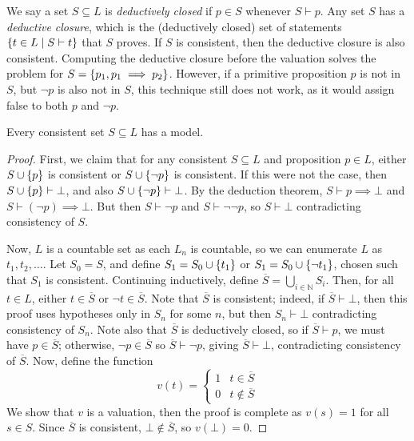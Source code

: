 We say a set \( S \subseteq L \) is \emph{deductively closed} if \( p \in S \) whenever \( S \vdash p \).
Any set \( S \) has a \emph{deductive closure}, which is the (deductively closed) set of statements \( \qty{t \in L \mid S \vdash t} \) that \( S \) proves.
If \( S \) is consistent, then the deductive closure is also consistent.
Computing the deductive closure before the valuation solves the problem for \( S = \qty{p_1, p_1 \implies p_2} \).
However, if a primitive proposition \( p \) is not in \( S \), but \( \neg p \) is also not in \( S \), this technique still does not work, as it would assign false to both \( p \) and \( \neg p \).
\begin{theorem}
    Every consistent set \( S \subseteq L \) has a model.
\end{theorem}
\begin{proof}
    First, we claim that for any consistent \( S \subseteq L \) and proposition \( p \in L \), either \( S \cup \qty{p} \) is consistent or \( S \cup \qty{\neg p} \) is consistent.
    If this were not the case, then \( S \cup \qty{p} \vdash \bot \), and also \( S \cup \qty{\neg p} \vdash \bot \).
    By the deduction theorem, \( S \vdash p \implies \bot \) and \( S \vdash (\neg p) \implies \bot \).
    But then \( S \vdash \neg p \) and \( S \vdash \neg\neg p \), so \( S \vdash \bot \) contradicting consistency of \( S \).
    
    Now, \( L \) is a countable set as each \( L_n \) is countable, so we can enumerate \( L \) as \( t_1, t_2, \dots \).
    Let \( S_0 = S \), and define \( S_1 = S_0 \cup \qty{t_1} \) or \( S_1 = S_0 \cup \qty{\neg t_1} \), chosen such that \( S_1 \) is consistent.
    Continuing inductively, define \( \overline S = \bigcup_{i \in \mathbb N} S_i \).
    Then, for all \( t \in L \), either \( t \in \overline S \) or \( \neg t \in \overline S \).
    Note that \( \overline S \) is consistent; indeed, if \( \overline S \vdash \bot \), then this proof uses hypotheses only in \( S_n \) for some \( n \), but then \( S_n \vdash \bot \) contradicting consistency of \( S_n \).
    Note also that \( \overline S \) is deductively closed, so if \( \overline S \vdash p \), we must have \( p \in \overline S \); otherwise, \( \neg p \in \overline S \) so \( \overline S \vdash \neg p \), giving \( \overline S \vdash \bot \), contradicting consistency of \( \overline S \).
    Now, define the function
    \[ v(t) = \begin{cases}
        1 & t \in \overline S \\
        0 & t \not\in \overline S
    \end{cases} \]
    We show that \( v \) is a valuation, then the proof is complete as \( v(s) = 1 \) for all \( s \in S \).
    Since \( \overline S \) is consistent, \( \bot \not\in \overline S \), so \( v(\bot) = 0 \).
    

\end{proof}
